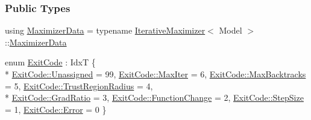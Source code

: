 \subsubsection*{Public Types}
\begin{DoxyCompactItemize}
\item 
using \hyperlink{classmappel_1_1NewtonMaximizer_af5da826cdff84efbe35e4268916fe810}{Maximizer\+Data} = typename \hyperlink{classmappel_1_1IterativeMaximizer}{Iterative\+Maximizer}$<$ Model $>$\+::\hyperlink{classmappel_1_1NewtonMaximizer_af5da826cdff84efbe35e4268916fe810}{Maximizer\+Data}
\item 
enum \hyperlink{classmappel_1_1IterativeMaximizer_a5dc8660cf33abf3f3a576f051466521c}{Exit\+Code} \+: IdxT \{ \\*
\hyperlink{classmappel_1_1IterativeMaximizer_a5dc8660cf33abf3f3a576f051466521ca3476bf9c3af766198bfbd4f065a51e69}{Exit\+Code\+::\+Unassigned} = 99, 
\hyperlink{classmappel_1_1IterativeMaximizer_a5dc8660cf33abf3f3a576f051466521cabbf52264f7a6e91c48a242f95aeed3db}{Exit\+Code\+::\+Max\+Iter} = 6, 
\hyperlink{classmappel_1_1IterativeMaximizer_a5dc8660cf33abf3f3a576f051466521ca9e5d3183756d69b44432394db6b6fd86}{Exit\+Code\+::\+Max\+Backtracks} = 5, 
\hyperlink{classmappel_1_1IterativeMaximizer_a5dc8660cf33abf3f3a576f051466521caadd208e6fbd6ef5ab84a287f259c3b81}{Exit\+Code\+::\+Trust\+Region\+Radius} = 4, 
\\*
\hyperlink{classmappel_1_1IterativeMaximizer_a5dc8660cf33abf3f3a576f051466521ca8d0cc41d71102a7952fefe3c63244fd4}{Exit\+Code\+::\+Grad\+Ratio} = 3, 
\hyperlink{classmappel_1_1IterativeMaximizer_a5dc8660cf33abf3f3a576f051466521ca8d75b053f108781c02ac7c22facc4338}{Exit\+Code\+::\+Function\+Change} = 2, 
\hyperlink{classmappel_1_1IterativeMaximizer_a5dc8660cf33abf3f3a576f051466521ca071449462d0c247e47313eb8c3129dd0}{Exit\+Code\+::\+Step\+Size} = 1, 
\hyperlink{classmappel_1_1IterativeMaximizer_a5dc8660cf33abf3f3a576f051466521ca902b0d55fddef6f8d651fe1035b7d4bd}{Exit\+Code\+::\+Error} = 0
 \}
\end{DoxyCompactItemize}
